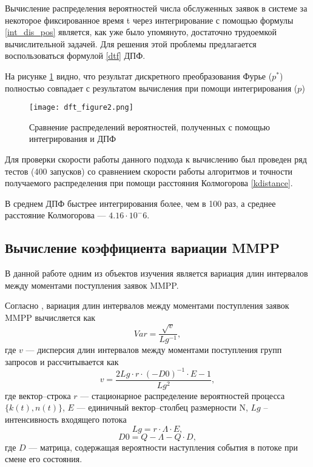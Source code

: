 Вычисление распределения вероятностей числа обслуженных заявок в системе за некоторое фиксированное время t через интегрирование с помощью формулы \eqref{int_dis_pos} является, как уже было упомянуто, достаточно трудоемкой вычислительной задачей. Для решения этой проблемы предлагается воспользоваться формулой \eqref{dtf} ДПФ.

На рисунке \ref{dft_figure2z} видно, что результат дискретного преобразования Фурье ($p^*$) полностью совпадает с результатом вычисления при помощи интегрирования ($p$)
\begin{figure}[H]
	\centering
	\texttt{[image: dft\_figure2.png]}
	\caption{Сравнение распределений вероятностей, полученных с помощью интегрирования и ДПФ}
	\label{dft_figure2z}
\end{figure}

Для проверки скорости работы данного подхода к вычислению был проведен ряд тестов (400 запусков) со сравнением скорости работы алгоритмов и точности получаемого распределения при помощи расстояния Колмогорова \eqref{kdistance}.

В среднем ДПФ быстрее интегрирования более, чем в 100 раз, а среднее расстояние Колмогорова --- $4.16 \cdot 10^-6$.

\subsection{Вычисление коэффициента вариации MMPP}
В данной работе одним из объектов изучения является вариация длин интервалов между моментами поступления заявок MMPP.

Согласно \cite{вишневский2018стохастические}, вариация длин интервалов между моментами поступления заявок MMPP вычисляется как
\begin{equation}
	Var = \frac{\sqrt{v}}{Lg^{-1}},
\end{equation}
где $v$ --- дисперсия длин интервалов между моментами поступления групп запросов и рассчитывается как
\begin{equation}
	v = \frac{2Lg\cdot r \cdot (-D0)^{-1} \cdot E -1}{Lg^2},
\end{equation}
где вектор--строка $r$ --- стационарное распределение вероятностей процесса\\$\{k(t),n(t)\}$, $E$ --- единичный вектор--столбец размерности N, $Lg$ -- интенсивность входящего потока
\begin{equation} \label{eq_lg}
	Lg = r\cdot \Lambda \cdot E,
\end{equation}
\begin{equation*}
	D0 = Q - \Lambda - Q\cdot D,
\end{equation*}
где $D$ --- матрица, содержащая вероятности наступления события в потоке при смене его состояния.
\clearpage
